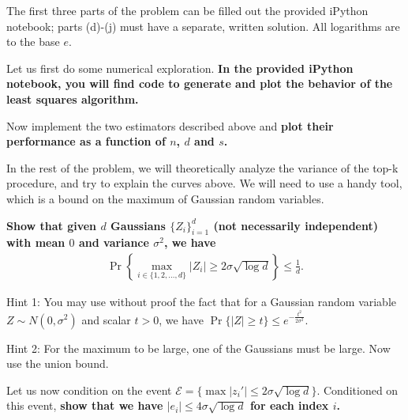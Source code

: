 The first three parts of the problem can be filled out the provided iPython notebook; parts (d)-(j) must have a separate, written solution. All logarithms are to the base $e$.

\begin{Parts}
\Part Let us first do some numerical exploration. {\bf In the provided iPython notebook, you will find code to generate and plot the behavior of the least squares algorithm.}



\Part Now implement the two estimators described above and {\bf plot their performance as a function of $n$, $d$ and $s$.}






\Part In the rest of the problem, we will theoretically analyze the variance of the top-k procedure, and try to explain the curves above. We will need to use a handy tool, which is a bound on the maximum of Gaussian random variables.

{\bf Show that given $d$ Gaussians $\{Z_i\}_{i=1}^d$ (not necessarily independent) with mean $0$ and variance $\sigma^2$, we have}
\begin{align*}
\Pr \left\{ \max_{i \in \{1, 2, \ldots, d\}} |Z_i| \geq 2 \sigma \sqrt{\log d} \right\} \leq \frac{1}{d}.
\end{align*}

Hint 1: You may use without proof the fact that for a Gaussian random variable $Z \sim N(0, \sigma^2)$ and scalar $t > 0$, we have $\Pr\{|Z| \geq t\} \leq e^{- \frac{t^2}{2\sigma^2}}$.

Hint 2: For the maximum to be large, one of the Gaussians must be large. Now use the union bound.









\Part Let us now condition on the event $\mathcal{E} = \{\max |z_i'| \leq 2 \sigma \sqrt{\log d} \}$. Conditioned on this event, {\bf show that we have $|e_i| \leq 4 \sigma \sqrt{\log d}$ for each index $i$.}




\end{Parts}

